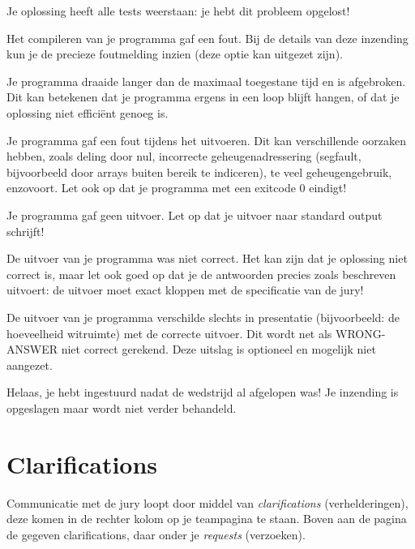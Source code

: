 \begin{description}[\setleftmargin{4.5cm}]
\item[CORRECT]
Je oplossing heeft alle tests weerstaan: je hebt dit probleem opgelost!

\item[COMPILER-ERROR]
Het compileren van je programma gaf een fout. Bij de details
van deze inzending kun je de precieze foutmelding inzien
(deze optie kan uitgezet zijn).

\item[TIMELIMIT]
Je programma draaide langer dan de maximaal toegestane tijd en is
afgebroken. Dit kan betekenen dat je programma ergens in een loop
blijft hangen, of dat je oplossing niet effici\"ent genoeg is.

\item[RUN-ERROR]
Je programma gaf een fout tijdens het uitvoeren. Dit kan verschillende
oorzaken hebben, zoals deling door nul, incorrecte geheugen\-adressering
(segfault, bijvoorbeeld door arrays buiten bereik te indiceren), te
veel geheugengebruik, enzovoort.
Let ook op dat je programma met een exitcode 0 eindigt!

\item[NO-OUTPUT]
Je programma gaf geen uitvoer. Let op dat je uitvoer naar standard
output schrijft!

\item[WRONG-ANSWER]
De uitvoer van je programma was niet correct. Het kan zijn dat je
oplossing niet correct is, maar let ook goed op dat je de antwoorden
precies zoals beschreven uitvoert: de uitvoer moet exact kloppen met
de specificatie van de jury!

\item[PRESENTATION-ERROR]
De uitvoer van je programma verschilde slechts in presentatie
(bijvoorbeeld: de hoeveelheid witruimte) met de correcte uitvoer.
Dit wordt net als WRONG-ANSWER niet correct gerekend. Deze uitslag
is optioneel en mogelijk niet aangezet.

\item[TOO-LATE]
Helaas, je hebt ingestuurd nadat de wedstrijd al afgelopen was!
Je inzending is opgeslagen maar wordt niet verder behandeld.
\end{description}

\section{Clarifications}

Communicatie met de jury loopt door middel van \emph{clarifications}
(verhelderingen), deze komen in de rechter kolom op je teampagina te
staan. Boven aan de pagina de gegeven clarifications, daar onder je
\emph{requests} (verzoeken).

